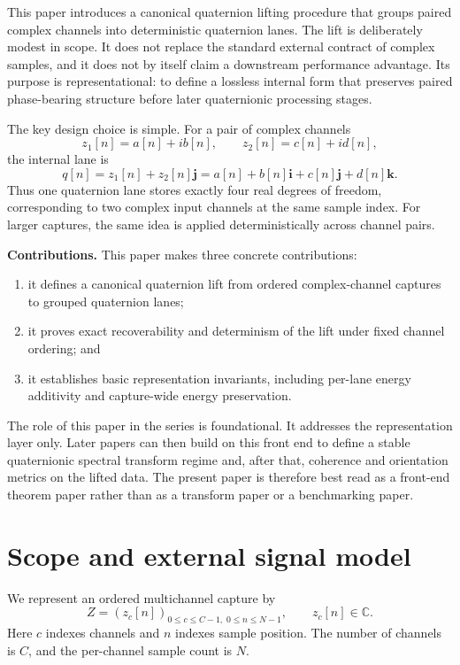 \documentclass[11pt]{article}
\theoremstyle{remark}
\newcommand{\C}{\mathbb{C}}
\newcommand{\ii}{\mathbf{i}}
\newcommand{\jj}{\mathbf{j}}
\newcommand{\kk}{\mathbf{k}}
\begin{document}
This paper introduces a canonical quaternion lifting procedure that groups paired complex channels into deterministic quaternion lanes. The lift is deliberately modest in scope. It does not replace the standard external contract of complex samples, and it does not by itself claim a downstream performance advantage. Its purpose is representational: to define a lossless internal form that preserves paired phase-bearing structure before later quaternionic processing stages.

The key design choice is simple. For a pair of complex channels
\[
z_1[n]=a[n]+ib[n],
\qquad
z_2[n]=c[n]+id[n],
\]
the internal lane is
\[
q[n]=z_1[n]+z_2[n]\jj
     = a[n]+b[n]\ii+c[n]\jj+d[n]\kk.
\]
Thus one quaternion lane stores exactly four real degrees of freedom, corresponding to two complex input channels at the same sample index. For larger captures, the same idea is applied deterministically across channel pairs.

\medskip
\noindent\textbf{Contributions.}
This paper makes three concrete contributions:
\begin{enumerate}[label=(\arabic*)]
    \item it defines a canonical quaternion lift from ordered complex-channel captures to grouped quaternion lanes;
    \item it proves exact recoverability and determinism of the lift under fixed channel ordering; and
    \item it establishes basic representation invariants, including per-lane energy additivity and capture-wide energy preservation.
\end{enumerate}

The role of this paper in the series is foundational. It addresses the representation layer only. Later papers can then build on this front end to define a stable quaternionic spectral transform regime and, after that, coherence and orientation metrics on the lifted data. The present paper is therefore best read as a front-end theorem paper rather than as a transform paper or a benchmarking paper.

\section{Scope and external signal model}

We represent an ordered multichannel capture by
\[
Z=(z_c[n])_{0\le c \le C-1,\; 0\le n \le N-1},
\qquad
z_c[n]\in\C.
\]
Here \(c\) indexes channels and \(n\) indexes sample position. The number of channels is \(C\), and the per-channel sample count is \(N\).
\end{document}
